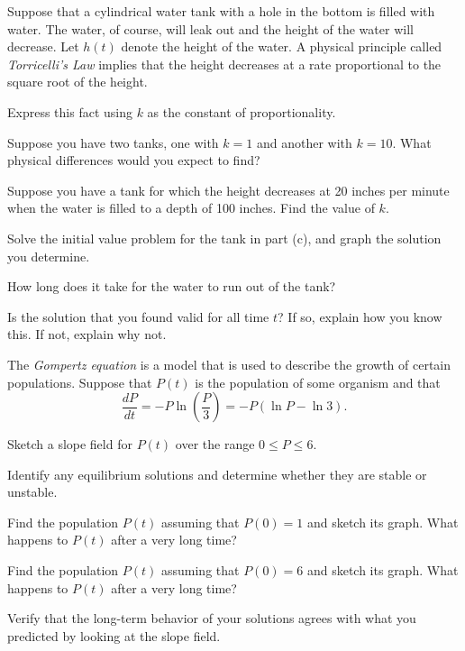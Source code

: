 \begin{exercises}
  \item  Suppose that a cylindrical water tank with a hole in the
    bottom is filled with water.  The water, of course, will leak out
    and the height of the water will decrease.  Let $h(t)$ denote the
    height of the water.  A physical principle called {\em Torricelli's
      Law} implies that the height decreases at a rate proportional to
    the square root of the height.

    \ba
    \item Express this fact using $k$ as the constant of
      proportionality.  
    \item Suppose you have two tanks, one with $k=1$ and another with
      $k=10$.  What physical differences would you expect to find?
    \item Suppose you have a tank for which the height decreases at 20
      inches per minute when the water is filled to a depth of 100
      inches.  Find the value of $k$.  
    \item Solve the initial value problem for the tank in part (c), and graph the solution you determine.
    \item How long does it take for the water to run out of the tank?
    \item Is the solution that you found valid for all time $t$?  If
      so, explain how you know this.  If not, explain why not.
    \ea

  \item The {\em Gompertz equation} is a model that is used to
    describe the growth of certain populations.  Suppose that $P(t)$
    is the population of some organism and that
    $$
    \frac{dP}{dt} = -P\ln\left(\frac P3\right) = -P(\ln P - \ln 3).
    $$

    \ba
    \item Sketch a slope field for $P(t)$ over the range $0\leq P\leq
      6$.

    \item Identify any equilibrium solutions and determine whether
      they are stable or unstable.

    \item Find the population $P(t)$ assuming that $P(0) = 1$ and sketch
      its graph.  What happens to $P(t)$ after a very long time?

    \item Find the population $P(t)$ assuming that $P(0) = 6$ and sketch
      its graph.  What happens to $P(t)$ after a very long time?

    \item Verify that the long-term behavior of your solutions agrees
      with what you predicted by looking at the slope field.

      \ea
        
\end{exercises}
\afterexercises
